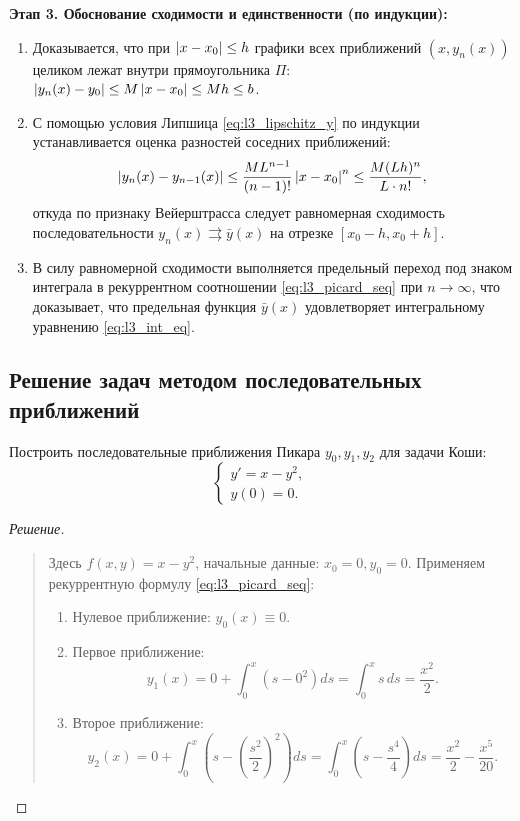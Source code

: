 \textbf{Этап 3. Обоснование сходимости и единственности (по индукции):}
\begin{enumerate}
    \item Доказывается, что при $\left| x - x_0 \right| \le h$ графики всех приближений
    $(x, y_n(x))$ целиком лежат внутри прямоугольника $\Pi$:
    $\left| y_n(x) - y_0 \right| \le M \left| x - x_0 \right| \le M h \le b$.
    \item С помощью условия Липшица \eqref{eq:l3_lipschitz_y} по индукции
    устанавливается оценка разностей соседних приближений:
    \[
        \left| y_n(x) - y_{n-1}(x) \right| \le \frac{M L^{n-1}}{(n - 1)!}
        \left| x - x_0 \right|^n \le \frac{M (L h)^n}{L \cdot n!},
    \]
    откуда по признаку Вейерштрасса следует равномерная сходимость
    последовательности $y_n(x) \rightrightarrows \bar{y}(x)$ на отрезке
    $[x_0 - h, x_0 + h]$.
    \item В силу равномерной сходимости выполняется предельный переход под
    знаком интеграла в рекуррентном соотношении \eqref{eq:l3_picard_seq} при
    $n \to \infty$, что доказывает, что предельная функция $\bar{y}(x)$
    удовлетворяет интегральному уравнению \eqref{eq:l3_int_eq}.
\end{enumerate}

\subsection{Решение задач методом последовательных приближений}

\begin{problem}[Ф.221(а)]
    Построить последовательные приближения Пикара $y_0, y_1, y_2$ для задачи
    Коши:
    \[
        \begin{cases}
            y' = x - y^2, \\
            y(0) = 0.
        \end{cases}
    \]
\end{problem}

\begin{proof}[Решение]~\\
    \begin{quote}
        Здесь $f(x, y) = x - y^2$, начальные данные: $x_0 = 0, y_0 = 0$.
        Применяем рекуррентную формулу \eqref{eq:l3_picard_seq}:
        \begin{enumerate}
            \item Нулевое приближение: $y_0(x) \equiv 0$.
            \item Первое приближение:
            \[
                y_1(x) = 0 + \int_{0}^{x} \left(s - 0^2\right) ds =
                \int_{0}^{x} s \, ds = \frac{x^2}{2}.
            \]
            \item Второе приближение:
            \[
                y_2(x) = 0 + \int_{0}^{x} \left(s -
                \left(\frac{s^2}{2}\right)^2\right) ds =
                \int_{0}^{x} \left(s - \frac{s^4}{4}\right) ds =
                \frac{x^2}{2} - \frac{x^5}{20}.
            \]
        \end{enumerate}
    \end{quote}
\end{proof}

